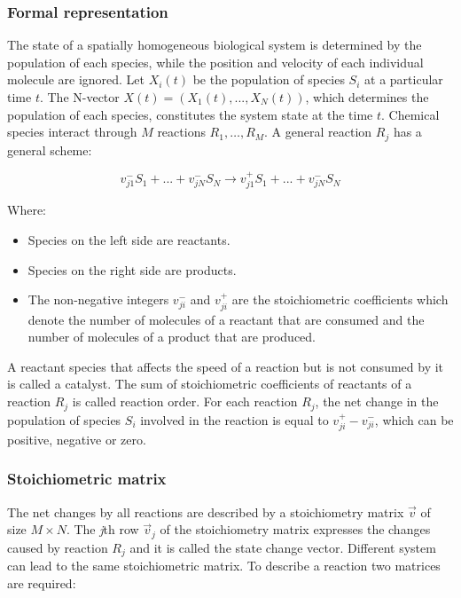     \subsubsection{Formal representation}
    The state of a spatially homogeneous biological system is determined by the population of each species, while the position and velocity of each individual molecule are ignored.
    Let $X_i(t)$ be the population of species $S_i$ at a particular time $t$.
    The N-vector $X(t) = (X_1(t),...,X_N(t))$, which determines the population of each species, constitutes the system state at the time $t$.
    Chemical species interact through $M$ reactions $R_1, \dots, R_M$.
    A general reaction $R_j$ has a general scheme:

    $$v^-_{j1}S_1+...+v^-_{jN}S_N \rightarrow v^+_{j1}S_1+...+v^-_{jN}S_N$$

    Where:

    \begin{multicols}{2}
      \begin{itemize}
        \item Species on the left side are reactants.
        \item Species on the right side are products.
        \item The non-negative integers $v^-_{ji}$ and $v^+_{ji}$ are the stoichiometric coefficients which denote the number of molecules of a reactant that are consumed and the number of molecules of a product that are produced.
      \end{itemize}
    \end{multicols}

    A reactant species that affects the speed of a reaction but is not consumed by it is called a catalyst.
    The sum of stoichiometric coefficients of reactants of a reaction $R_j$ is called reaction order.
    For each reaction $R_j$, the net change in the population of species $S_i$ involved in the reaction is equal to $v^+_{ji}-v^-_{ji}$, which can be positive, negative or zero.

    \subsubsection{Stoichiometric matrix}
    The net changes by all reactions are described by a stoichiometry matrix $\vec{v}$ of size $M × N$.
    The \emph{j}th row $\vec{v}_j$ of the stoichiometry matrix expresses the changes caused by reaction $R_j$ and it is called the state change vector.
    Different system can lead to the same stoichiometric matrix.
    To describe a reaction two matrices are required:

